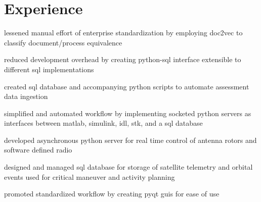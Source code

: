 \begin{minipage}[t]{0.66\textwidth} %


\section{Experience}
\vspace{\topsep}
\begin{tightitemize}
    \item lessened manual effort of enterprise standardization by employing doc2vec to classify document/process equivalence
    \item reduced development overhead by creating python-sql interface extensible to different sql implementations
    \item created sql database and accompanying python scripts to automate assessment data ingestion
\end{tightitemize}


\begin{tightitemize}
    \item simplified and automated workflow by implementing socketed python servers as interfaces between matlab, simulink, idl, stk, and a sql database
    \item developed asynchronous python server for real time control of antenna rotors and software defined radio
    \item designed and managed sql database for storage of satellite telemetry and orbital events used for critical maneuver and activity planning
    \item promoted standardized workflow by creating pyqt guis for ease of use
\end{tightitemize}



\end{minipage}
